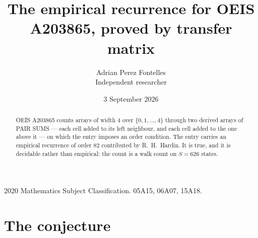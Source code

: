 \documentclass[11pt,a4paper]{article}
\title{The empirical recurrence for OEIS A203865, proved by transfer matrix}
\author{Adrian Perez Fontelles\\ \small Independent researcher}
\date{3 September 2026}
\theoremstyle{plain}
\theoremstyle{definition}
\begin{document}
\maketitle

\begin{abstract}
OEIS A203865 counts arrays of width $4$ over $\{0,1,\dots,4\}$ through two derived arrays of PAIR SUMS ---
each cell added to its left neighbour, and each cell added to the one above it --- on which the
entry imposes an order condition. The entry carries an empirical recurrence of order $82$
contributed by R.~H.~Hardin. It is true, and it is decidable rather than empirical: the count is
a walk count on $S=626$ states.
\end{abstract}

\noindent\small 2020 Mathematics Subject Classification. 05A15, 06A07, 15A18.\normalsize

\section{The conjecture}
\end{document}
